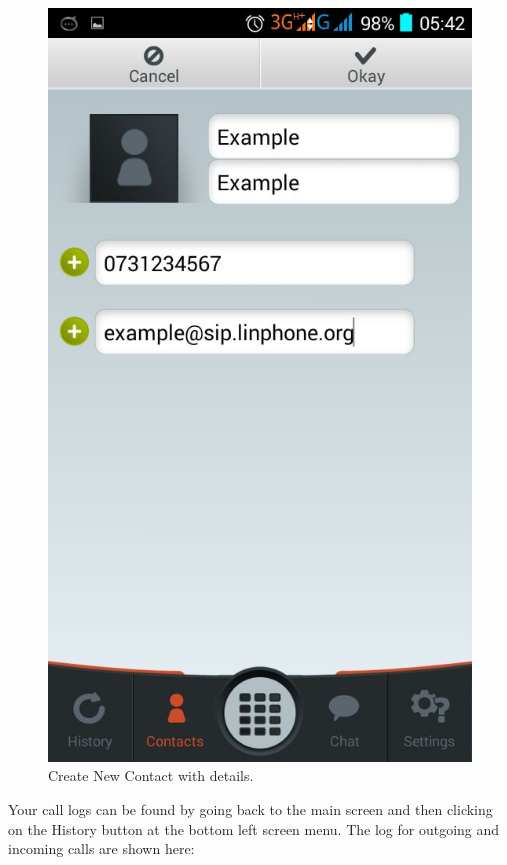 \documentclass[a4paper]{article}
\begin{document}
\begin{center}
\begin{figure}[H]
\centering
\includegraphics[width=0.7\linewidth]{pictures/Screenshot_2015-08-04-05-40-26.png}
\caption{\label{fig:Screen8}Create New Contact with details.}
\end{figure}
\end{center}

Your call logs can be found by going back to the main screen and then clicking on the History button at the bottom left screen menu. The log for outgoing and incoming calls are shown here:
\end{document}
